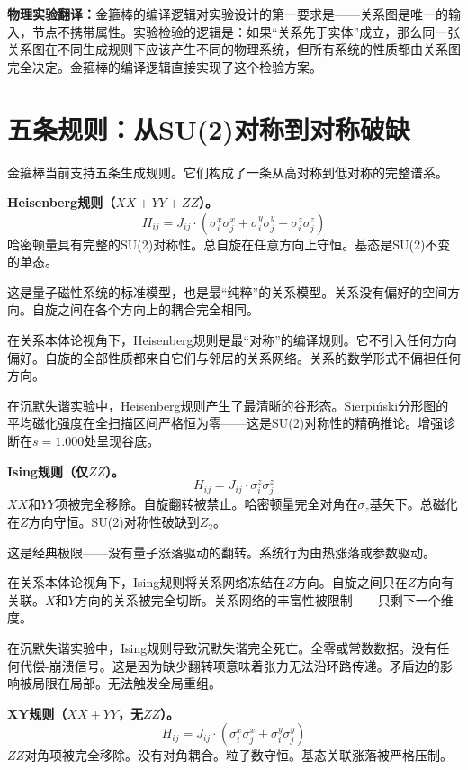 \documentclass[11pt,a4paper]{book}
\theoremstyle{definition}
\begin{document}
\textbf{物理实验翻译：}金箍棒的编译逻辑对实验设计的第一要求是——关系图是唯一的输入，节点不携带属性。实验检验的逻辑是：如果“关系先于实体”成立，那么同一张关系图在不同生成规则下应该产生不同的物理系统，但所有系统的性质都由关系图完全决定。金箍棒的编译逻辑直接实现了这个检验方案。

\section{五条规则：从SU(2)对称到对称破缺}

金箍棒当前支持五条生成规则。它们构成了一条从高对称到低对称的完整谱系。

\textbf{Heisenberg规则（$XX+YY+ZZ$）。}
\begin{equation}
H_{ij} = J_{ij} \cdot (\sigma_i^x \sigma_j^x + \sigma_i^y \sigma_j^y + \sigma_i^z \sigma_j^z)
\end{equation}
哈密顿量具有完整的SU(2)对称性。总自旋在任意方向上守恒。基态是SU(2)不变的单态。

这是量子磁性系统的标准模型，也是最“纯粹”的关系模型。关系没有偏好的空间方向。自旋之间在各个方向上的耦合完全相同。

在关系本体论视角下，Heisenberg规则是最“对称”的编译规则。它不引入任何方向偏好。自旋的全部性质都来自它们与邻居的关系网络。关系的数学形式不偏袒任何方向。

在沉默失谐实验中，Heisenberg规则产生了最清晰的谷形态。Sierpiński分形图的平均磁化强度在全扫描区间严格恒为零——这是SU(2)对称性的精确推论。增强诊断在$s=1.000$处呈现谷底。

\textbf{Ising规则（仅$ZZ$）。}
\begin{equation}
H_{ij} = J_{ij} \cdot \sigma_i^z \sigma_j^z
\end{equation}
$XX$和$YY$项被完全移除。自旋翻转被禁止。哈密顿量完全对角在$\sigma_z$基矢下。总磁化在$Z$方向守恒。SU(2)对称性破缺到$Z_2$。

这是经典极限——没有量子涨落驱动的翻转。系统行为由热涨落或参数驱动。

在关系本体论视角下，Ising规则将关系网络冻结在$Z$方向。自旋之间只在$Z$方向有关联。$X$和$Y$方向的关系被完全切断。关系网络的丰富性被限制——只剩下一个维度。

在沉默失谐实验中，Ising规则导致沉默失谐完全死亡。全零或常数数据。没有任何代偿-崩溃信号。这是因为缺少翻转项意味着张力无法沿环路传递。矛盾边的影响被局限在局部。无法触发全局重组。

\textbf{XY规则（$XX+YY$，无$ZZ$）。}
\begin{equation}
H_{ij} = J_{ij} \cdot (\sigma_i^x \sigma_j^x + \sigma_i^y \sigma_j^y)
\end{equation}
$ZZ$对角项被完全移除。没有对角耦合。粒子数守恒。基态关联涨落被严格压制。
\end{document}
